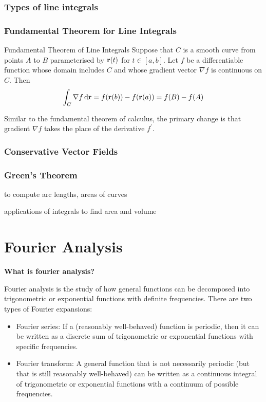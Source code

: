 \subsection{Types of line integrals}

\subsection{Fundamental Theorem for Line Integrals}
\begin{thrm}{Fundamental Theorem of Line Integrals}{}
Suppose that $C$ is a smooth curve from points $A$ to $B$ parameterised by $\vb{r}(t)$ for $t\in[a,b]$. Let $f$ be a differentiable function whose domain includes $C$ and whose gradient vector $\nabla f$ is continuous on $C$. Then
\begin{equation}
\int_C \nabla f \dd{\vb{r}} = f(\vb{r}(b)) - f(\vb{r}(a)) = f(B) - f(A)
\end{equation}
\end{thrm}
\begin{remark}
Similar to the fundamental theorem of calculus, the primary change is that gradient $\nabla f$ takes the place of the derivative $f^\prime$.
\end{remark}

\subsection{Conservative Vector Fields}

\subsection{Green's Theorem}


to compute arc lengths, areas of curves 

applications of integrals to find area and volume

\chapter{Fourier Analysis}

\textbf{What is fourier analysis?}

Fourier analysis is the study of how general functions can be decomposed into trigonometric or exponential functions with definite frequencies. There are two types of Fourier expansions:

\begin{itemize}
\item Fourier series: If a (reasonably well-behaved) function is periodic, then it can be written as a discrete sum of trigonometric or exponential functions with specific frequencies.
\item Fourier transform: A general function that is not necessarily periodic (but that is still reasonably well-behaved) can be written as a continuous integral of trigonometric or exponential functions with a continuum of possible frequencies.
\end{itemize}

